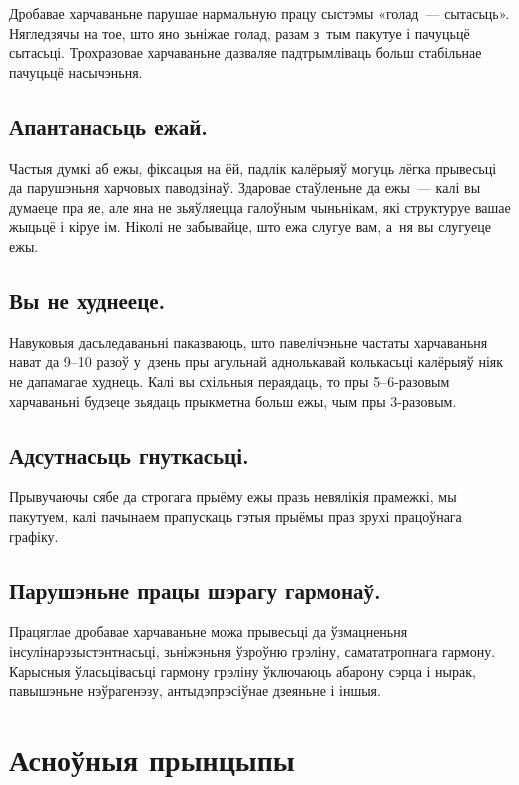 Дробавае харчаваньне парушае нармальную працу сыстэмы «голад~--- сытасьць». Нягледзячы на тое, што яно зьніжае голад, разам з~тым пакутуе і пачуцьцё сытасьці. Трохразовае харчаваньне дазваляе падтрымліваць больш стабільнае пачуцьцё насычэньня.

\subsection{Апантанасьць ежай.}
Частыя думкі аб ежы, фіксацыя на ёй, падлік калёрыяў могуць лёгка прывесьці да парушэньня харчовых паводзінаў. Здаровае стаўленьне да ежы~--- калі вы думаеце пра яе, але яна не зьяўляецца галоўным чыньнікам, які структуруе вашае жыцьцё і кіруе ім. Ніколі не забывайце, што ежа слугуе вам, а~ня вы слугуеце ежы.

\subsection{Вы не худнееце.}
Навуковыя дасьледаваньні паказваюць, што павелічэньне частаты харчаваньня нават да 9--10 разоў у~дзень пры агульнай аднолькавай колькасьці калёрыяў ніяк не дапамагае худнець. Калі вы схільныя пераядаць, то пры 5--6-разовым харчаваньні будзеце зьядаць прыкметна больш ежы, чым пры 3-разовым.


\subsection{Адсутнасьць гнуткасьці.}
Прывучаючы сябе да строгага прыёму ежы празь невялікія прамежкі, мы пакутуем, калі пачынаем прапускаць гэтыя прыёмы праз зрухі працоўнага графіку.

\subsection{Парушэньне працы шэрагу гармонаў.}
Працяглае дробавае харчаваньне можа прывесьці да ўзмацненьня інсулінарэзыстэнтнасьці, зьніжэньня ўзроўню грэліну, самататропнага гармону. Карысныя ўласьцівасьці гармону грэліну ўключаюць абарону сэрца і нырак, павышэньне нэўрагенэзу, антыдэпрэсіўнае дзеяньне і іншыя.

\section{Асноўныя прынцыпы}

